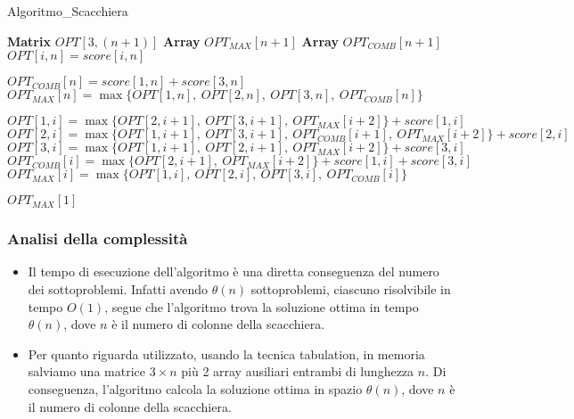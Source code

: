 \begin{algorithm}
	\caption{Algoritmo\_Scacchiera}
	\begin{algorithmic}[1]
		\State {}
		\State \textbf{Matrix} $OPT[3, (n + 1)]$ 
		\State \textbf{Array} $OPT_{MAX}[n + 1]$
		\State \textbf{Array} $OPT_{COMB}[n + 1]$ 
		\State {}
		\State $OPT[i, n] = score[i, n]$
		\EndFor
		
		\State $OPT_{COMB}[n] = score[1,n] + score[3,n]$
		\State $OPT_{MAX}[n] = \max\{OPT[1,n],\ OPT[2,n],\ OPT[3,n],\ OPT_{COMB}[n]\}$
		\State {}
		
		\State {}
		\State $OPT[1, i] = \max\{OPT[2, i + 1],\ OPT[3, i + 1],\ OPT_{MAX}[i + 2]\} + score[1, i]$\\
		
		\State $OPT[2, i] = \max\{OPT[1, i + 1],\ OPT[3, i + 1],\ OPT_{COMB}[i + 1],\ OPT_{MAX}[i + 2]\} + score[2, i]$\\
		
		\State $OPT[3, i] = \max\{OPT[1, i + 1],\ OPT[2, i + 1],\ OPT_{MAX}[i + 2]\} + score[3, i]$\\
		
		\State $OPT_{COMB}[i] = \max\{OPT[2, i + 1],\ OPT_{MAX}[i + 2]\} + score[1, i] + score[3, i]$\\
		
		\State $OPT_{MAX}[i] = \max\{OPT[1, i],\ OPT[2, i],\ OPT[3, i],\ OPT_{COMB}[i]\}$
		\EndFor
		
		\Return $OPT_{MAX}[1]$
		\EndFunction
	\end{algorithmic}
\end{algorithm}

\subsubsection*{Analisi della complessità}

\begin{itemize}
	\item{
		Il tempo di esecuzione dell'algoritmo è una diretta conseguenza del numero dei sottoproblemi. Infatti avendo $\theta(n)$ sottoproblemi,
		ciascuno risolvibile in tempo $O(1)$, segue che l'algoritmo trova la soluzione ottima in tempo $\theta(n)$, dove $n$ è il numero di colonne della scacchiera.
	}
	\item{
		Per quanto riguarda utilizzato, usando la tecnica tabulation, in memoria salviamo una matrice $3 \times n$ più 2 array ausiliari entrambi di lunghezza $n$.
		Di conseguenza, l'algoritmo calcola la soluzione ottima in spazio $\theta(n)$, dove $n$ è il numero di colonne della scacchiera. 
	}
\end{itemize}


